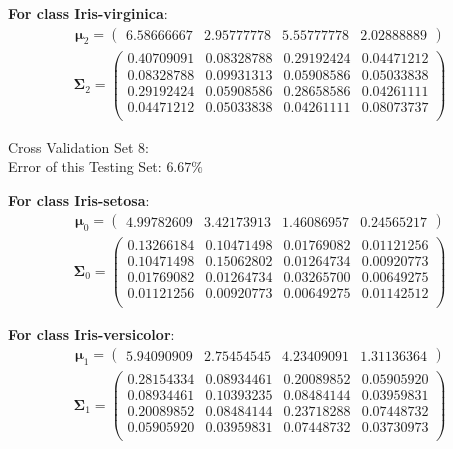 \documentclass[11pt,a4paper]{article}
\newcommand{\htab}{\hspace*{0.63cm}}
\newcommand{\bs}[1]{\boldsymbol{#1}}
\begin{document}
\textbf{For class Iris-virginica}:
\begin{align} \bs{\mu}_{2} = \begin{pmatrix} 
6.58666667 & 2.95777778 & 5.55777778 & 2.02888889 
 \end{pmatrix}  \end{align} 
\vspace{-1cm}
\begin{align} \bs{\Sigma}_{2} = \begin{pmatrix} 
0.40709091 & 0.08328788 & 0.29192424 & 0.04471212 \\ 
0.08328788 & 0.09931313 & 0.05908586 & 0.05033838 \\ 
0.29192424 & 0.05908586 & 0.28658586 & 0.04261111 \\ 
0.04471212 & 0.05033838 & 0.04261111 & 0.08073737 \\ 
\end{pmatrix} \end{align}


Cross Validation Set 8: \\
\htab Error of this Testing Set: $6.67\%$ 

\textbf{For class Iris-setosa}:
\begin{align} \bs{\mu}_{0} = \begin{pmatrix} 
4.99782609 & 3.42173913 & 1.46086957 & 0.24565217 
 \end{pmatrix}  \end{align} 
\vspace{-1cm}
\begin{align} \bs{\Sigma}_{0} = \begin{pmatrix} 
0.13266184 & 0.10471498 & 0.01769082 & 0.01121256 \\ 
0.10471498 & 0.15062802 & 0.01264734 & 0.00920773 \\ 
0.01769082 & 0.01264734 & 0.03265700 & 0.00649275 \\ 
0.01121256 & 0.00920773 & 0.00649275 & 0.01142512 \\ 
\end{pmatrix} \end{align}

\textbf{For class Iris-versicolor}:
\begin{align} \bs{\mu}_{1} = \begin{pmatrix} 
5.94090909 & 2.75454545 & 4.23409091 & 1.31136364 
 \end{pmatrix}  \end{align} 
\vspace{-1cm}
\begin{align} \bs{\Sigma}_{1} = \begin{pmatrix} 
0.28154334 & 0.08934461 & 0.20089852 & 0.05905920 \\ 
0.08934461 & 0.10393235 & 0.08484144 & 0.03959831 \\ 
0.20089852 & 0.08484144 & 0.23718288 & 0.07448732 \\ 
0.05905920 & 0.03959831 & 0.07448732 & 0.03730973 \\ 
\end{pmatrix} \end{align}
\end{document}
